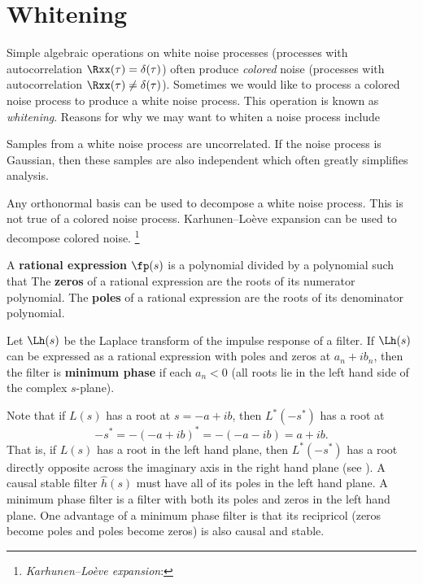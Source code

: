 \section{Whitening}
\label{sec:whiten}
Simple algebraic operations on white noise processes
(processes with autocorrelation $\Rxx(\tau)=\delta(\tau)$)
often produce {\em colored} noise
(processes with autocorrelation $\Rxx(\tau)\ne\delta(\tau)$).
Sometimes we would like to process a colored noise process
to produce a white noise process.
This operation is known as {\em whitening}.
Reasons for why we may want to whiten a noise process include
\begin{enume}
   \item Samples from a white noise process are uncorrelated.
         If the noise process is Gaussian, then these samples
         are also independent which often greatly simplifies analysis.
   \item Any orthonormal basis can be used to decompose a white noise process.
         This is not true of a colored noise process.
         Karhunen--Lo\`eve expansion can be used to decompose colored noise.
         \footnote{{\em Karhunen--Lo\`eve expansion}: }
\end{enume}

\begin{definition}
A \textbf{rational expression} $\fp(s)$ is a polynomial divided by a polynomial
such that
The \textbf{zeros} of a rational expression are the roots of its numerator polynomial.
The \textbf{poles} of a rational expression are the roots of its denominator polynomial.
\end{definition}

\begin{definition}
Let $\Lh(s)$ be the Laplace transform of the impulse response of a filter.
If $\Lh(s)$ can be expressed as a rational expression with poles and zeros at
$a_n + ib_n$,
then the filter is \textbf{minimum phase} if each $a_n<0$
(all roots lie in the left hand side of the complex $s$-plane).
\end{definition}

Note that if $L(s)$ has a root at $s=-a+ib$, then
$L^\ast(-s^\ast)$ has a root at
  \[  -s^\ast = -(-a+ib)^\ast = -(-a-ib) = a+ib.   \]
That is, if $L(s)$ has a root in the left hand plane,
then $L^\ast(-s^\ast)$ has a root directly opposite across the imaginary
axis in the right hand plane (see ).
A causal stable filter $\hat{h}(s)$ must have all of its poles in the
left hand plane.
A minimum phase filter is a filter with both its poles and zeros in the
left hand plane.
One advantage of a minimum phase filter is that its recipricol
(zeros become poles and poles become zeros)
is also causal and stable.

